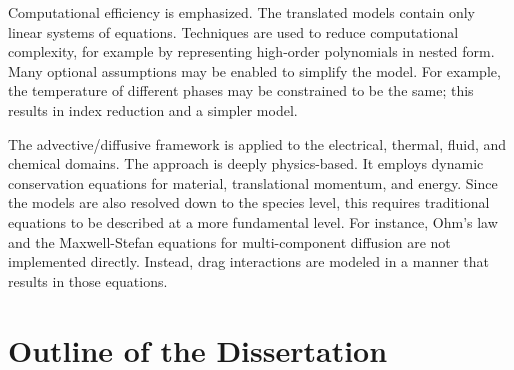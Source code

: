 Computational efficiency is emphasized.  The translated models contain only linear systems of equations.  Techniques are used to reduce computational complexity, for example by representing high-order polynomials in nested form.  Many optional assumptions may be enabled to simplify the model.  For example, the temperature of different phases may be constrained to be the same; this results in index reduction and a simpler model.

The advective\slash{}diffusive framework is applied to the electrical, thermal, fluid, and chemical domains.  The approach is deeply physics-based.  It employs dynamic conservation equations for material, translational momentum, and energy.  Since the models are also resolved down to the species level, this requires traditional equations to be described at a more fundamental level.  For instance, Ohm's law and the Maxwell-Stefan equations for multi-component diffusion are not implemented directly.  Instead, drag interactions are modeled in a manner that results in those equations.



\section{Outline of the Dissertation}
\label{sec:Outline}


